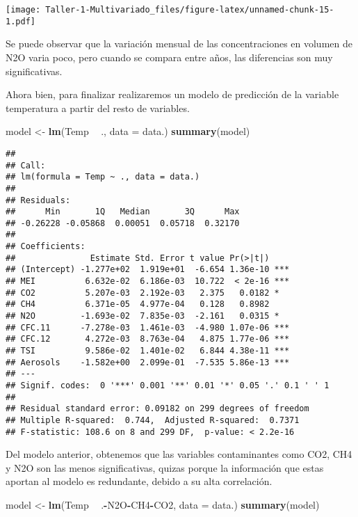 \documentclass[]{article}
\newenvironment{Shaded}{\begin{snugshade}}{\end{snugshade}}
\newcommand{\KeywordTok}[1]{\textcolor[rgb]{0.13,0.29,0.53}{\textbf{#1}}}
\newcommand{\DataTypeTok}[1]{\textcolor[rgb]{0.13,0.29,0.53}{#1}}
\newcommand{\StringTok}[1]{\textcolor[rgb]{0.31,0.60,0.02}{#1}}
\newcommand{\OperatorTok}[1]{\textcolor[rgb]{0.81,0.36,0.00}{\textbf{#1}}}
\newcommand{\NormalTok}[1]{#1}
\begin{document}
\texttt{[image: Taller-1-Multivariado\_files/figure-latex/unnamed-chunk-15-1.pdf]}

Se puede observar que la variación mensual de las concentraciones en
volumen de N2O varia poco, pero cuando se compara entre años, las
diferencias son muy significativas.

Ahora bien, para finalizar realizaremos un modelo de predicción de la
variable temperatura a partir del resto de variables.

\begin{Shaded}
\begin{Highlighting}[]
\NormalTok{model <-}\StringTok{ }\KeywordTok{lm}\NormalTok{(Temp }\OperatorTok{~}\StringTok{ }\NormalTok{., }\DataTypeTok{data =}\NormalTok{ data.)}
\KeywordTok{summary}\NormalTok{(model)}
\end{Highlighting}
\end{Shaded}

\begin{verbatim}
## 
## Call:
## lm(formula = Temp ~ ., data = data.)
## 
## Residuals:
##      Min       1Q   Median       3Q      Max 
## -0.26228 -0.05868  0.00051  0.05718  0.32170 
## 
## Coefficients:
##               Estimate Std. Error t value Pr(>|t|)    
## (Intercept) -1.277e+02  1.919e+01  -6.654 1.36e-10 ***
## MEI          6.632e-02  6.186e-03  10.722  < 2e-16 ***
## CO2          5.207e-03  2.192e-03   2.375   0.0182 *  
## CH4          6.371e-05  4.977e-04   0.128   0.8982    
## N2O         -1.693e-02  7.835e-03  -2.161   0.0315 *  
## CFC.11      -7.278e-03  1.461e-03  -4.980 1.07e-06 ***
## CFC.12       4.272e-03  8.763e-04   4.875 1.77e-06 ***
## TSI          9.586e-02  1.401e-02   6.844 4.38e-11 ***
## Aerosols    -1.582e+00  2.099e-01  -7.535 5.86e-13 ***
## ---
## Signif. codes:  0 '***' 0.001 '**' 0.01 '*' 0.05 '.' 0.1 ' ' 1
## 
## Residual standard error: 0.09182 on 299 degrees of freedom
## Multiple R-squared:  0.744,  Adjusted R-squared:  0.7371 
## F-statistic: 108.6 on 8 and 299 DF,  p-value: < 2.2e-16
\end{verbatim}

Del modelo anterior, obtenemos que las variables contaminantes como CO2,
CH4 y N2O son las menos significativas, quizas porque la información que
estas aportan al modelo es redundante, debido a su alta correlación.

\begin{Shaded}
\begin{Highlighting}[]
\NormalTok{model <-}\StringTok{ }\KeywordTok{lm}\NormalTok{(Temp }\OperatorTok{~}\StringTok{ }\NormalTok{.}\OperatorTok{-}\NormalTok{N2O}\OperatorTok{-}\NormalTok{CH4}\OperatorTok{-}\NormalTok{CO2, }\DataTypeTok{data =}\NormalTok{ data.)}
\KeywordTok{summary}\NormalTok{(model)}
\end{Highlighting}
\end{Shaded}
\end{document}
